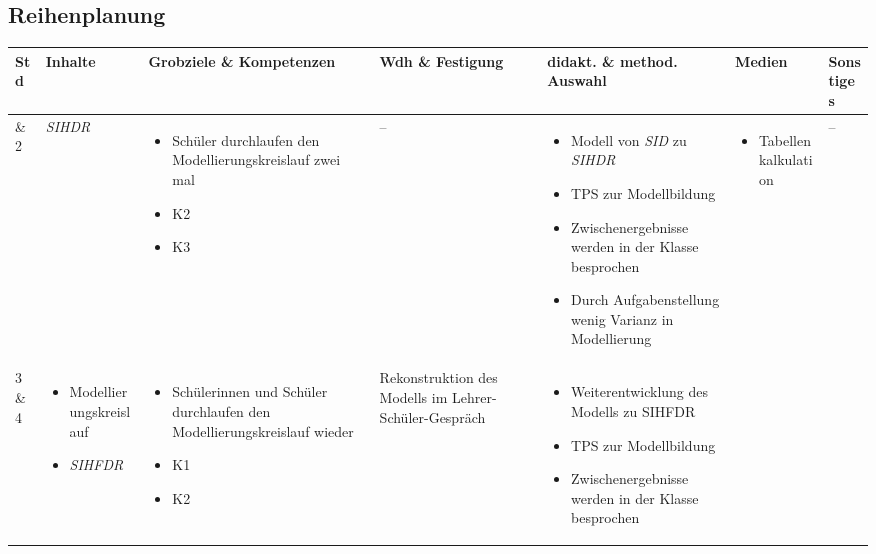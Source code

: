 \begin{landscape}
\subsection{Reihenplanung}
\noindent
\begin{longtable}{|C{0.05\textwidth}|L{0.2\textwidth}|L{0.3\textwidth}|L{0.25\textwidth}|L{0.3\textwidth}|L{0.25\textwidth}|L{0.1\textwidth}|}
\hline
Std&Inhalte&Grobziele \& Kompetenzen&Wdh \& Festigung&didakt. \& method. Auswahl&Medien&Sonstiges\\
\hline\hline
\endhead
\hline
{}\&{}2 &\emph{SIHDR}&\begin{itemize}
	\item Schüler durchlaufen den Modellierungskreislauf zwei mal
	\item K2
	\item K3
\end{itemize}&--&\begin{itemize}
	\item Modell von \emph{SID} zu \emph{SIHDR}
	\item TPS zur Modellbildung
	\item Zwischenergebnisse werden in der Klasse besprochen
	\item Durch Aufgabenstellung wenig Varianz in Modellierung
\end{itemize}&\begin{itemize}
	\item Ta\-bel\-len\-kal\-ku\-la\-tion
\end{itemize}&--\\\&{}4&\begin{itemize}
	\item Mo\-del\-lier\-ungs\-kreis\-lauf
	\item \emph{SIHFDR}
\end{itemize}&\begin{itemize}
\item Schülerinnen und Schüler durchlaufen den Modellierungskreislauf wieder 
\item K1
\item K2
\end{itemize}&Rekonstruktion des Modells im Lehrer-Schüler-Gespräch&
\begin{itemize}
\item Weiterentwicklung des Modells zu SIHFDR
\item TPS zur Modellbildung
\item Zwischenergebnisse werden in der Klasse besprochen

\end{itemize}
\end{longtable}
\end{landscape}
